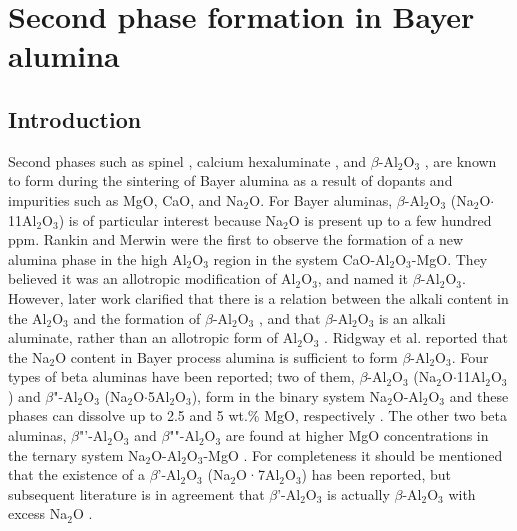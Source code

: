 \chapter{Second phase formation in Bayer alumina}

\section{Introduction}
Second phases such as spinel \cite{Zuo2013}, calcium hexaluminate \cite{Cinibulk1995}, and $\beta$-Al$_{2}$O$_{3}$ \cite{Duncan1969a}, are known to form during the sintering of Bayer alumina as a result of dopants and impurities such as MgO, CaO, and Na$_{2}$O. For Bayer aluminas, $\beta$-Al$_{2}$O$_{3}$ (Na$_{2}$O$\cdot$11Al$_{2}$O$_{3}$) is of particular interest because Na$_{2}$O is present up to a few hundred ppm. Rankin and Merwin \cite{Rankin1916} were the first to observe the formation of a new alumina phase in the high Al$_{2}$O$_{3}$ region in the system CaO-Al$_{2}$O$_{3}$-MgO. They believed it was an allotropic modification of Al$_{2}$O$_{3}$, and named it $\beta$-Al$_{2}$O$_{3}$. However, later work clarified that there is a relation between the alkali content in the Al$_{2}$O$_{3}$ and the formation of $\beta$-Al$_{2}$O$_{3}$ \cite{Stillwell1926}, and that $\beta$-Al$_{2}$O$_{3}$ is an alkali aluminate, rather than an allotropic form of Al$_{2}$O$_{3}$ \cite{Vries1969}. Ridgway et al. \cite{Ridgway1936} reported that the Na$_{2}$O content in Bayer process alumina is sufficient to form $\beta$-Al$_{2}$O$_{3}$. Four types of beta aluminas have been reported; two of them, $\beta$-Al$_{2}$O$_{3}$ (Na$_{2}$O$\cdot$11Al$_{2}$O$_{3}$) and $\beta$"-Al$_{2}$O$_{3}$ (Na$_{2}$O$\cdot$5Al$_{2}$O$_{3}$), form in the binary system Na$_{2}$O-Al$_{2}$O$_{3}$ and these phases can dissolve up to 2.5 and 5 wt.\% MgO, respectively \cite{Kummer1972a}. The other two beta aluminas, $\beta$"'-Al$_{2}$O$_{3}$ and $\beta$""-Al$_{2}$O$_{3}$ are found at higher MgO concentrations in the ternary system Na$_{2}$O-Al$_{2}$O$_{3}$-MgO \cite{Kummer1972a,Stevens1984}. For completeness it should be mentioned that the existence of a $\beta$'-Al$_{2}$O$_{3}$ (Na$_{2}$O·7Al$_{2}$O$_{3}$) has been reported, but subsequent literature is in agreement that $\beta$'-Al$_{2}$O$_{3}$ is actually $\beta$-Al$_{2}$O$_{3}$ with excess Na$_{2}$O \cite{Kummer1972a,Stevens1984}.

